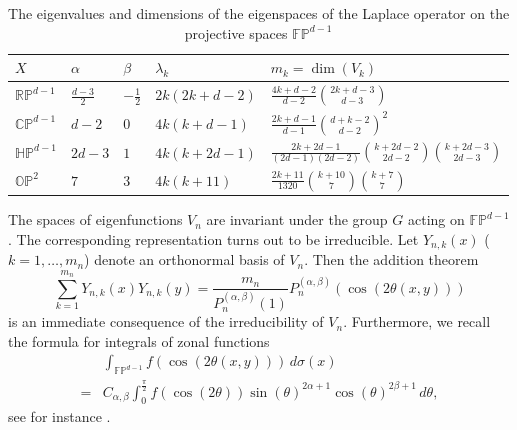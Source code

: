 \begin{table}[h]
  \renewcommand{\arraystretch}{1.8}
  \begin{tabular}{l| l| l|l|l}
    $X$  & $\alpha$&$\beta$& $\lambda_k$&$m_k = \dim(V_k)$ \\[2mm]\hline
    $\mathbb{RP}^{d-1}$ & $\frac{d-3}2$&$-\frac12$&$2k (2k+d-2)$ &
    $ \frac{4k+d-2}{d-2}\binom{2k+d-3}{d-3}$\\[2mm]\hline
    $\mathbb{CP}^{d-1}$ & $d-2$&$0$&$4k (k+d-1)$ &
    $ \frac{2k+d-1}{d-1}\binom{d+k-2}{d-2}^2$\\[2mm]\hline
    $\mathbb{HP}^{d-1}$&$2d-3$&$1$ & $4k (k+2d-1)$ &
    $ \frac{2k+2d-1}{(2d-1)(2d-2)} \binom{k+2d-2}{2d-2} \binom{k+2d-3}{2d-3}$
    \\[2mm]\hline
    $\mathbb{OP}^{2}$ & $7$&$3$&$4k (k+11)$ &
    $ \frac{2k+11}{1320} \binom{k+10}{7} \binom{k+7}{7}$\\
  \end{tabular}
  \caption{\label{tab:eigen}
    The eigenvalues and dimensions of the eigenspaces of the
    Laplace operator on the projective spaces $\mathbb{FP}^{d-1}$}
\end{table}

The spaces of eigenfunctions $V_n$ are invariant under the group $G$ acting on
$\mathbb{FP}^{d-1}$. The corresponding representation turns out to be
irreducible. Let $Y_{n,k}(x)$ ($k=1,\ldots,m_n$) denote an orthonormal basis of
$V_n$. Then the addition theorem
\begin{equation}\label{eq:addition}
  \sum_{k=1}^{m_n}Y_{n,k}(x)Y_{n,k}(y)=\frac{m_n}{P_n^{(\alpha,\beta)}(1)}
  P_n^{(\alpha,\beta)}(\cos(2\theta(x,y)))
\end{equation}
is an immediate consequence of the irreducibility of $V_n$. Furthermore, we
recall the formula for integrals of zonal functions
\begin{equation}
  \label{eq:zonal}
  \begin{split}
    &\int_{\mathbb{FP}^{d-1}}f(\cos(2\theta(x,y)))\,d\sigma(x)\\
    =
    &C_{\alpha,\beta}\int_0^{\frac\pi2}f(\cos(2\theta))\sin(\theta)^{2\alpha+1}
    \cos(\theta)^{2\beta+1}\,d\theta,
  \end{split}
\end{equation}
see for instance \cite{Helgason1965:radon_transform}.

